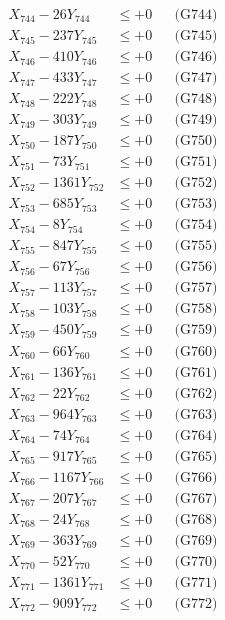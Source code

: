 \documentclass[a4paper,10pt]{article}
\begin{document}
{\begin{align}
X_{744} - 26Y_{744} &\leq +0 && \text{(G744)} \\
X_{745} - 237Y_{745} &\leq +0 && \text{(G745)} \\
X_{746} - 410Y_{746} &\leq +0 && \text{(G746)} \\
X_{747} - 433Y_{747} &\leq +0 && \text{(G747)} \\
X_{748} - 222Y_{748} &\leq +0 && \text{(G748)} \\
X_{749} - 303Y_{749} &\leq +0 && \text{(G749)} \\
X_{750} - 187Y_{750} &\leq +0 && \text{(G750)} \\
\allowbreak
X_{751} - 73Y_{751} &\leq +0 && \text{(G751)} \\
X_{752} - 1361Y_{752} &\leq +0 && \text{(G752)} \\
X_{753} - 685Y_{753} &\leq +0 && \text{(G753)} \\
X_{754} - 8Y_{754} &\leq +0 && \text{(G754)} \\
X_{755} - 847Y_{755} &\leq +0 && \text{(G755)} \\
X_{756} - 67Y_{756} &\leq +0 && \text{(G756)} \\
X_{757} - 113Y_{757} &\leq +0 && \text{(G757)} \\
X_{758} - 103Y_{758} &\leq +0 && \text{(G758)} \\
X_{759} - 450Y_{759} &\leq +0 && \text{(G759)} \\
X_{760} - 66Y_{760} &\leq +0 && \text{(G760)} \\
\allowbreak
X_{761} - 136Y_{761} &\leq +0 && \text{(G761)} \\
X_{762} - 22Y_{762} &\leq +0 && \text{(G762)} \\
X_{763} - 964Y_{763} &\leq +0 && \text{(G763)} \\
X_{764} - 74Y_{764} &\leq +0 && \text{(G764)} \\
X_{765} - 917Y_{765} &\leq +0 && \text{(G765)} \\
X_{766} - 1167Y_{766} &\leq +0 && \text{(G766)} \\
X_{767} - 207Y_{767} &\leq +0 && \text{(G767)} \\
X_{768} - 24Y_{768} &\leq +0 && \text{(G768)} \\
X_{769} - 363Y_{769} &\leq +0 && \text{(G769)} \\
X_{770} - 52Y_{770} &\leq +0 && \text{(G770)} \\
\allowbreak
X_{771} - 1361Y_{771} &\leq +0 && \text{(G771)} \\
X_{772} - 909Y_{772} &\leq +0 && \text{(G772)} \\

\end{align}}
\end{document}
